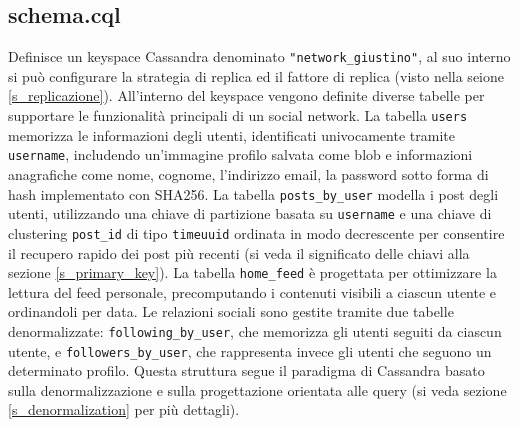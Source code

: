 \documentclass[12pt]{article}
\begin{document}
\subsection{schema.cql}
Definisce un keyspace Cassandra denominato \texttt{"network\_giustino"}, al suo interno si può configurare la strategia di replica ed il fattore di replica (visto nella seione \ref{s_replicazione}).\newline\newline
All'interno del keyspace vengono definite diverse tabelle per supportare le funzionalità principali di un social network. La tabella \texttt{users} memorizza le informazioni degli utenti, identificati univocamente tramite \texttt{username}, includendo un'immagine profilo salvata come blob e informazioni anagrafiche come nome, cognome, l’indirizzo email, la password sotto forma di hash implementato con SHA256.\newline\newline
La tabella \texttt{posts\_by\_user} modella i post degli utenti, utilizzando una chiave di partizione basata su \texttt{username} e una chiave di clustering \texttt{post\_id} di tipo \texttt{timeuuid} ordinata in modo decrescente per consentire il recupero rapido dei post più recenti (si veda il significato delle chiavi alla sezione \ref{s_primary_key}).\newline
La tabella \texttt{home\_feed} è progettata per ottimizzare la lettura del feed personale, precomputando i contenuti visibili a ciascun utente e ordinandoli per data.\newline
Le relazioni sociali sono gestite tramite due tabelle denormalizzate: \texttt{following\_by\_user}, che memorizza gli utenti seguiti da ciascun utente, e \texttt{followers\_by\_user}, che rappresenta invece gli utenti che seguono un determinato profilo.\newline\newline
Questa struttura segue il paradigma di Cassandra basato sulla denormalizzazione e sulla progettazione orientata alle query (si veda sezione \ref{s_denormalization} per più dettagli).
\end{document}
